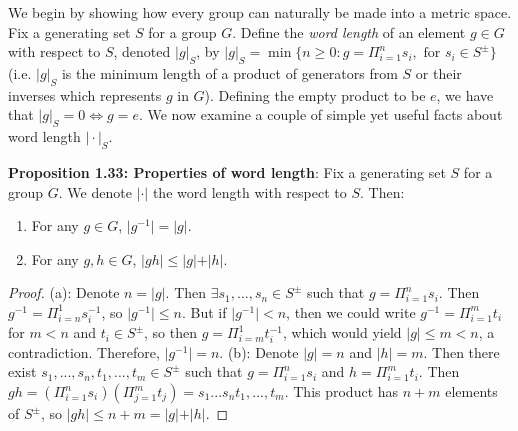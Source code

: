 \documentclass[12pt]{article}
\newcommand{\vs}{\vskip10pt}
\begin{document}
	\vs 
	
	We begin by showing how every group can naturally be made into a metric space. Fix a generating set $S$ for a group $G$. Define the \textit{word length} of an element $g \in G$ with respect to $S$, denoted $\vert g \vert_S$, by $\vert g \vert_S = \min \{n \geq 0: g = \Pi_{i=1}^n s_i, \text{ for } s_i \in S^{\pm}\}$ (i.e. $\vert g \vert_S$ is the minimum length of a product of generators from $S$ or their inverses which represents $g$ in $G$). Defining the empty product to be $e$, we have that $\vert g \vert_S = 0 \iff g = e$. We now examine a couple of simple yet useful facts about word length $\vert \cdot \vert_S$. 
	
		\vs 
	
	\textbf{Proposition 1.33: Properties of word length}: Fix a generating set $S$ for a group $G$. We denote $\vert \cdot \vert$ the word length with respect to $S$. Then: 
	
	\begin{enumerate}[label = (\alph*)]
		\item For any $g \in G$, $\vert g^{-1} \vert = \vert g \vert$. 
		\item For any $g,h \in G$, $\vert gh \vert \leq \vert g \vert + \vert h \vert$.
	\end{enumerate}
	
	\begin{proof}
		
		(a): Denote $n = \vert g \vert$. Then $\exists s_1,...,s_n \in S^{\pm}$ such that $g = \Pi_{i=1}^n s_i$. Then $g^{-1} = \Pi_{i=n}^{1} s_i^{-1}$, so $\vert g^{-1} \vert \leq n$. But if $\vert g^{-1} \vert < n$, then we could write $g^{-1} = \Pi_{i = 1}^m t_i$ for $m < n$ and $t_i \in S^{\pm}$, so then $g = \Pi_{i = m}^1 t_i^{-1}$, which would yield $\vert g \vert \leq m < n$, a contradiction. Therefore, $\vert g^{-1} \vert = n$. 
		\vs 
		(b): Denote $\vert g \vert = n$ and $\vert h \vert = m$. Then there exist $s_1,...,s_n,t_1,...,t_m \in S^{\pm}$ such that $g = \Pi_{i=1}^n s_i$ and $h = \Pi_{i=1}^m t_i$. Then $gh = (\Pi_{i=1}^n s_i)(\Pi_{j=1}^m t_j) = s_1...s_nt_1,...,t_m$. This product has $n+m$ elements of $S^{\pm}$, so $\vert gh \vert \leq n + m = \vert g \vert + \vert h \vert$.
		
	\end{proof}
	
\end{document}
